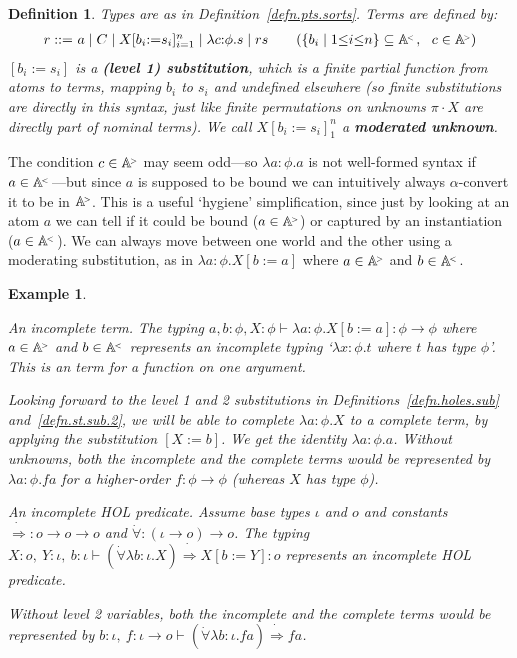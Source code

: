 \documentclass[submission,copyright]{eptcs}
\newtheorem{defn}[thrm]{Definition}
\newtheorem{xmpl}[thrm]{Example}
\newcommand{\rtm}{r}
\newcommand{\stm}{s}
\newcommand{\deffont}[1]{\textbf{#1}}
\newcommand{\lam}[1]{\lambda{#1}.}
\newcommand{\ssm}{:=}
\newcommand\fto{{\to}}
\newcommand\limp{{\Rightarrow}}
\newcommand{\act}{{\cdot}}
\newcommand\cent{\vdash}
\newcommand\atomsdown{\mathbb A^{\hspace{-.3ex}{}_{{}^<}}}
\newcommand\atomsup{\mathbb A^{\hspace{-.3ex}{}_{{}^>}\!}} \newcommand\basesort{\tau}
\begin{document}
\begin{defn}
\label{defn.holes.sorts}
Types are as in Definition~\ref{defn.pts.sorts}.
Terms are defined by:
\begin{displaymath}
\begin{array}{r@{\ }l}
\rtm      ::= & a \mid C \mid X[b_i{\ssm} s_i]_{i{=}1}^n \mid \lam{c{:}\phi}\stm \mid \rtm\stm \qquad (\{b_i\mid 1{\leq}i{\leq}n\}\subseteq\atomsdown,\ \ c\in\atomsup)
\end{array}
\end{displaymath}
$[b_i\ssm s_i]$ is a \deffont{(level 1) substitution}, which is a finite partial function from atoms to terms, mapping $b_i$ to $s_i$ and undefined elsewhere (so finite substitutions are directly in this syntax, just like finite permutations on unknowns $\pi\act X$ are directly part of nominal terms).
We call $X[b_i{\ssm}s_i]_1^n$ a \deffont{moderated unknown}.
\end{defn}
The condition $c\in\atomsup$ may seem odd---so $\lam{a{:}\phi}a$ is not well-formed syntax if $a\in\atomsdown$---but since $a$ is supposed to be bound we can intuitively always $\alpha$-convert it to be in $\atomsup$.  This is a useful `hygiene' simplification, since just by looking at an atom $a$ we can tell if it could be bound ($a\in\atomsup$) or captured by an instantiation ($a\in\atomsdown$).
We can always move between one world and the other using a moderating substitution, as in $\lam{a{:}\phi}X[b{\ssm} a]$ where $a\in\atomsup$ and $b\in\atomsdown$. 


\begin{xmpl}
\begin{itemize*}
\item
\emph{An incomplete term.}\quad
The typing $a,b{:}\phi,X{:}\phi\cent \lam{a{:}\phi}X[b{\ssm}a]:\phi\fto\phi$ where $a\in\atomsup$ and $b\in\atomsdown$ represents an incomplete typing `$\lam{x{:}\phi}t$ where $t$ has type $\phi$'. 
This is an term for a function on one argument.

Looking forward to the level 1 and 2 substitutions in Definitions~\ref{defn.holes.sub} and~\ref{defn.st.sub.2}, we will be able to complete $\lam{a{:}\phi}X$ to a complete term, by applying the substitution $[X\ssm b]$.
We get the identity $\lam{a{:}\phi}a$.
Without unknowns, both the incomplete and the complete terms would be represented by $\lam{a{:}\phi}fa$ for a higher-order $f:\phi\fto\phi$ (whereas $X$ has type $\phi$).
\item
\emph{An incomplete HOL predicate.}\quad
Assume base types $\iota$ and $o$ and constants $\dot\limp:o\fto o\fto o$ and $\dot\forall:(\iota\fto o)\fto o$.
The typing $X:o,\ Y:\iota,\ b{:}\iota\cent (\dot\forall\lam{b{:}\iota}X)\dot\limp X[b\ssm Y]:o$ represents an incomplete HOL predicate. 

Without level 2 variables, both the incomplete and the complete terms would be represented by $b{:}\iota,\ f:\iota\fto o\cent (\dot\forall\lam{b{:}\iota}fa)\dot\limp fa$.
\end{itemize*} 
\end{xmpl} 
\end{document}
